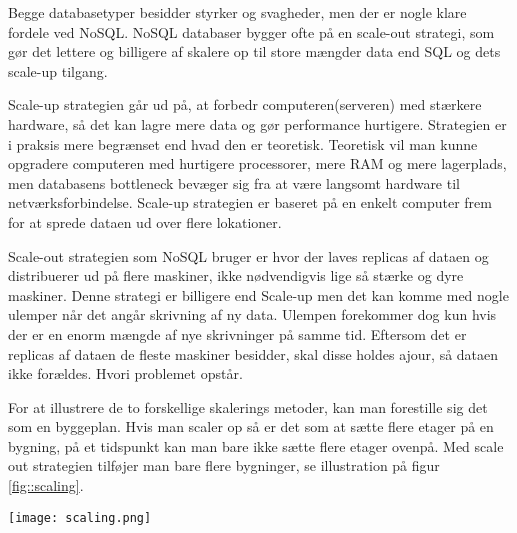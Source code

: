 Begge databasetyper besidder styrker og svagheder, men der er nogle klare fordele ved NoSQL. 
NoSQL databaser bygger ofte på en scale-out strategi, 
som gør det lettere og billigere af skalere op til store mængder data end SQL og dets scale-up tilgang.\newline

Scale-up strategien går ud på, at forbedr computeren(serveren) med stærkere hardware, 
så det kan lagre mere data og gør performance hurtigere. 
Strategien er i praksis mere begrænset end hvad den er teoretisk. 
Teoretisk vil man kunne opgradere computeren med hurtigere processorer, 
mere RAM og mere lagerplads, men databasens bottleneck bevæger sig fra at være langsomt 
hardware til netværksforbindelse. 
Scale-up strategien er baseret på en enkelt computer frem for at sprede dataen ud over flere lokationer.\newline

Scale-out strategien som NoSQL bruger er hvor der laves replicas af dataen og distribuerer ud på flere maskiner, 
ikke nødvendigvis lige så stærke og dyre maskiner. 
Denne strategi er billigere end Scale-up men det kan komme med nogle ulemper når det angår skrivning af ny data. 
Ulempen forekommer dog kun hvis der er en enorm mængde af nye skrivninger på samme tid. 
Eftersom det er replicas af dataen de fleste maskiner besidder, skal disse holdes ajour, 
så dataen ikke forældes. Hvori problemet opstår.\newline

For at illustrere de to forskellige skalerings metoder, kan man forestille sig det som en byggeplan. 
Hvis man scaler op så er det som at sætte flere etager på en bygning, 
på et tidspunkt kan man bare ikke sætte flere etager ovenpå. 
Med scale out strategien tilføjer man bare flere bygninger, se illustration på figur \ref{fig::scaling}.

\begin{center}
    \texttt{[image: scaling.png]}
    \label{fig::scaling}
\end{center}

